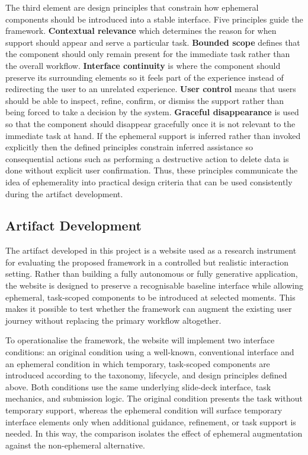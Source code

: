 The third element are design principles that constrain how ephemeral components should be introduced into a stable interface. Five principles guide the framework. \textbf{Contextual relevance} which determines the reason for when support should appear and serve a particular task. \textbf{Bounded scope} defines that the component should only remain present for the immediate task rather than the overall workflow. \textbf{Interface continuity} is where the component should preserve its surrounding elements so it feels part of the experience instead of redirecting the user to an unrelated experience. \textbf{User control} means that users should be able to inspect, refine, confirm, or dismiss the support rather than being forced to take a decision by the system. \textbf{Graceful disappearance} is used so that the component should disappear gracefully once it is not relevant to the immediate task at hand. If the ephemeral support is inferred rather than invoked explicitly then the defined principles constrain inferred assistance so consequential actions such as performing a destructive action to delete data is done without explicit user confirmation. Thus, these principles communicate the idea of ephemerality into practical design criteria that can be used consistently during the artifact development.

\subsection{Artifact Development}
The artifact developed in this project is a website used as a research instrument for evaluating the proposed framework in a controlled but realistic interaction setting. Rather than building a fully autonomous or fully generative application, the website is designed to preserve a recognisable baseline interface while allowing ephemeral, task-scoped components to be introduced at selected moments. This makes it possible to test whether the framework can augment the existing user journey without replacing the primary workflow altogether.

To operationalise the framework, the website will implement two interface conditions: an original condition using a well-known, conventional interface and an ephemeral condition in which temporary, task-scoped components are introduced according to the taxonomy, lifecycle, and design principles defined above. Both conditions use the same underlying slide-deck interface, task mechanics, and submission logic. The original condition presents the task without temporary support, whereas the ephemeral condition will surface temporary interface elements only when additional guidance, refinement, or task support is needed. In this way, the comparison isolates the effect of ephemeral augmentation against the non-ephemeral alternative.


